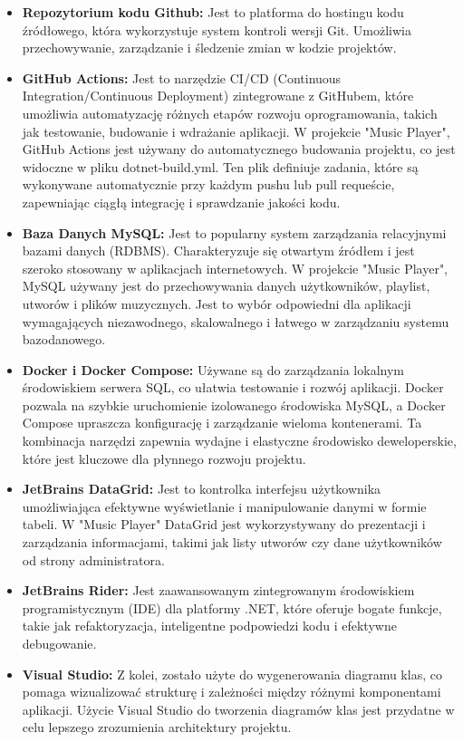 \begin{itemize}
    \item \textbf{ Repozytorium kodu Github:}  Jest to platforma do hostingu kodu źródłowego, która wykorzystuje system kontroli wersji Git. Umożliwia przechowywanie, zarządzanie i śledzenie zmian w kodzie projektów. 
    \item \textbf{ GitHub Actions:} Jest to narzędzie CI/CD (Continuous Integration/Continuous Deployment) zintegrowane z GitHubem, które umożliwia automatyzację różnych etapów rozwoju oprogramowania, takich jak testowanie, budowanie i wdrażanie aplikacji. W projekcie "Music Player", GitHub Actions jest używany do automatycznego budowania projektu, co jest widoczne w pliku dotnet-build.yml. Ten plik definiuje zadania, które są wykonywane automatycznie przy każdym pushu lub pull requeście, zapewniając ciągłą integrację i sprawdzanie jakości kodu.
    \item \textbf{ Baza Danych MySQL:} Jest to popularny system zarządzania relacyjnymi bazami danych (RDBMS). Charakteryzuje się otwartym źródłem i jest szeroko stosowany w aplikacjach internetowych. W projekcie "Music Player", MySQL używany jest do przechowywania danych użytkowników, playlist, utworów i plików muzycznych. Jest to wybór odpowiedni dla aplikacji wymagających niezawodnego, skalowalnego i łatwego w zarządzaniu systemu bazodanowego.
    \item \textbf{ Docker i Docker Compose:}  Używane są do zarządzania lokalnym środowiskiem serwera SQL, co ułatwia testowanie i rozwój aplikacji. Docker pozwala na szybkie uruchomienie izolowanego środowiska MySQL, a Docker Compose upraszcza konfigurację i zarządzanie wieloma kontenerami. Ta kombinacja narzędzi zapewnia wydajne i elastyczne środowisko deweloperskie, które jest kluczowe dla płynnego rozwoju projektu.
    \item \textbf{ JetBrains DataGrid:} Jest to kontrolka interfejsu użytkownika umożliwiająca efektywne wyświetlanie i manipulowanie danymi w formie tabeli. W "Music Player" DataGrid jest wykorzystywany do prezentacji i zarządzania informacjami, takimi jak listy utworów czy dane użytkowników od strony administratora.
    \item \textbf{ JetBrains Rider:}  Jest zaawansowanym zintegrowanym środowiskiem programistycznym (IDE) dla platformy .NET, które oferuje bogate funkcje, takie jak refaktoryzacja, inteligentne podpowiedzi kodu i efektywne debugowanie.
    \item \textbf{ Visual Studio: } Z kolei, zostało użyte do wygenerowania diagramu klas, co pomaga wizualizować strukturę i zależności między różnymi komponentami aplikacji. Użycie Visual Studio do tworzenia diagramów klas jest przydatne w celu lepszego zrozumienia architektury projektu.
    
\end{itemize}


